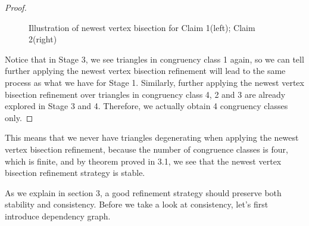 \begin{proof}
\begin{figure}[h!]
    \caption{Illustration of newest vertex bisection for Claim 1(left); Claim 2(right)}
    \label{Fig8}
    \end{figure}



    Notice that in Stage 3, we see triangles in congruency class 1 again, so we can tell further applying the newest vertex bisection refinement will lead to the same process as what we have for Stage 1. Similarly, further applying the newest vertex bisection refinement over triangles in congruency class 4, 2 and 3 are already explored in Stage 3 and 4. Therefore, we actually obtain 4 congruency classes only.
    \end{proof}
    This means that we never have triangles degenerating when applying the newest vertex bisection refinement, because the number of congruence classes is four, which is finite, and by theorem proved in 3.1, we see that the newest vertex bisection refinement strategy is stable.

    As we explain in section 3, a good refinement strategy should preserve both stability and consistency. Before we take a look at consistency, let's first introduce dependency graph.


